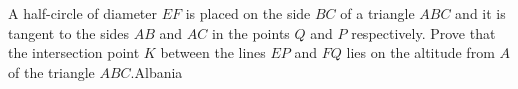A half-circle of diameter $EF$ is placed on the side $BC$ of a triangle $ABC$ and it is tangent to the sides $AB$ and $AC$ in the points $Q$ and $P$ respectively. Prove that the intersection point $K$ between the lines $EP$ and $FQ$ lies on the altitude from $A$ of the triangle $ABC$.Albania